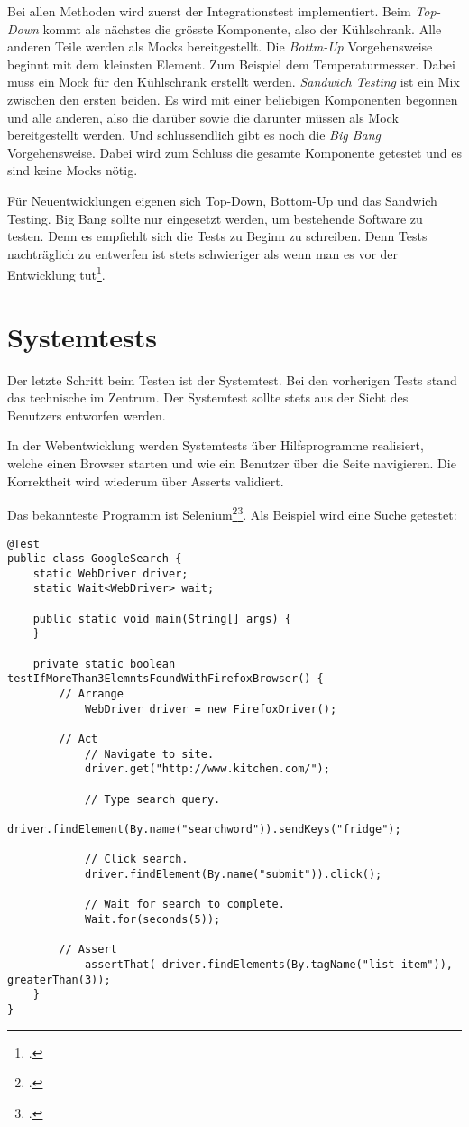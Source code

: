 Bei allen Methoden wird zuerst der Integrationstest implementiert. Beim \textit{Top-Down} kommt als nächstes die grösste Komponente, also der Kühlschrank. Alle anderen Teile werden als Mocks bereitgestellt. Die \textit{Bottm-Up} Vorgehensweise beginnt mit dem kleinsten Element. Zum Beispiel dem Temperaturmesser. Dabei muss ein Mock für den Kühlschrank erstellt werden. \textit{Sandwich Testing} ist ein Mix zwischen den ersten beiden. Es wird mit einer beliebigen Komponenten begonnen und alle anderen, also die darüber sowie die darunter müssen als Mock bereitgestellt werden. Und schlussendlich gibt es noch die \textit{Big Bang} Vorgehensweise. Dabei wird zum Schluss die gesamte Komponente getestet und es sind keine Mocks nötig. 

Für Neuentwicklungen eigenen sich Top-Down, Bottom-Up und das Sandwich Testing. Big Bang sollte nur eingesetzt werden, um bestehende Software zu testen. Denn es empfiehlt sich die Tests zu Beginn zu schreiben. Denn Tests nachträglich zu entwerfen ist stets schwieriger als wenn man es vor der Entwicklung tut\footcite{Madeyski10cpdf_2015-06-07}.

\section{Systemtests}
Der letzte Schritt beim Testen ist der Systemtest. Bei den vorherigen Tests stand das technische im Zentrum. Der Systemtest sollte stets aus der Sicht des Benutzers entworfen werden.

In der Webentwicklung werden Systemtests über Hilfsprogramme realisiert, welche einen Browser starten und wie ein Benutzer über die Seite navigieren. Die Korrektheit wird wiederum über Asserts validiert.

Das bekannteste Programm ist Selenium\footcite{Selenium_-_Web_Browser_Automation_2015-06-07}\footcite{The_Art_of_Unit_Testing}. Als Beispiel wird eine Suche getestet: 

\begin{lstlisting}
@Test
public class GoogleSearch {
    static WebDriver driver;
    static Wait<WebDriver> wait;
 
    public static void main(String[] args) {
    }
 
    private static boolean testIfMoreThan3ElemntsFoundWithFirefoxBrowser() {
        // Arrange
	        WebDriver driver = new FirefoxDriver();
        
        // Act
        	// Navigate to site.
        	driver.get("http://www.kitchen.com/");
        	        
	        // Type search query.
	        driver.findElement(By.name("searchword")).sendKeys("fridge");
	 
	        // Click search.
	        driver.findElement(By.name("submit")).click();
	 
	        // Wait for search to complete.
	        Wait.for(seconds(5));
 
        // Assert
        	assertThat( driver.findElements(By.tagName("list-item")), greaterThan(3));
    }
}
\end{lstlisting}

